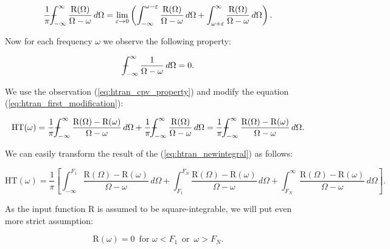 \documentclass[12pt,twoside,a4paper]{article}
\numberwithin{equation}{subsection}
\numberwithin{figure}{subsection}
\def\Xint#1{\mathchoice
{\XXint\displaystyle\textstyle{#1}}%
{\XXint\textstyle\scriptstyle{#1}}%
{\XXint\scriptstyle\scriptscriptstyle{#1}}%
{\XXint\scriptscriptstyle\scriptscriptstyle{#1}}%
\!\int}
\def\XXint#1#2#3{{\setbox0=\hbox{$#1{#2#3}{\int}$ }\vcenter{\hbox{$#2#3$ }}\kern-.6\wd0}}
\def\dashint{\Xint-}
\begin{document}
\begin{equation} \label{eq:htran_first_modification}
  \frac{1}{\pi } {\dashint_{ - \infty }^{\infty }  \frac {\mathrm{R}(\Omega )}{\Omega - \omega }\,d\Omega }
  = {\lim_{\varepsilon \rightarrow 0}} 
  	\left( \int_{ - \infty }^{\omega - \varepsilon } \frac {\mathrm{R}(\Omega )}{\Omega - \omega }\,d\Omega  
  	     + \int_{ \omega + \varepsilon }^{ \infty  } \frac {\mathrm{R}(\Omega )}{\Omega - \omega }\,d\Omega \right) .
\end{equation} 

Now for each frequency $\omega$ we observe the following property:

\begin{equation} \label{eq:htran_cpv_property}
	\dashint_{ - \infty }^{\infty } \frac {1}{\Omega  - \omega } \,d\Omega =0 .
\end{equation}

We use the observation (\ref{eq:htran_cpv_property}) and modify the equation (\ref{eq:htran_first_modification}):

\begin{equation} \label{eq:htran_newintegral}
  \mathrm{HT}(\omega )
  = \frac{1}{\pi } {\dashint_{ - \infty }^{\infty } \frac {\mathrm{R}(\Omega ) - \mathrm{R}(\omega )}{\Omega  - \omega }\,d\Omega }
  + \frac{1}{\pi } {\dashint_{ - \infty }^{\infty } \frac {\mathrm{R}(\Omega )}{\Omega  - \omega }\,d\Omega }
  = \frac{1}{\pi } {\dashint_{ - \infty }^{\infty } \frac {\mathrm{R}(\Omega ) - \mathrm{R}(\omega )}{\Omega - \omega }\,d\Omega} . 
\end{equation}

We can easily transform the result of the (\ref{eq:htran_newintegral}) as follows:

\begin{equation} \label{eq:htran_ht_three}
  \mathrm{HT}(\omega ) = \frac{1}{\pi } \left[ 
    \int_{ -\infty }^{F_1} \frac {\mathrm{R}(\Omega ) - \mathrm{R}(\omega )}{\Omega  - \omega }\,d\Omega 
  + \int_{ F_1 }^{ F_N }   \frac {\mathrm{R}(\Omega ) - \mathrm{R}(\omega )}{\Omega  - \omega }\,d\Omega 
  + \int_{ F_N }^{ \infty} \frac {\mathrm{R}(\Omega ) - \mathrm{R}(\omega )}{\Omega  - \omega }\,d\Omega 
  \right] .
\end{equation}

As the input function R is assumed to be square-integrable, we will put even more strict assumption:

\begin{equation} \label{eq:htran_vanishes}
  \mathrm{R}(\omega) = 0 \, \text{ for } \omega < F_1 \, \text { or } \, \omega > F_N.  
\end{equation}
\end{document}
